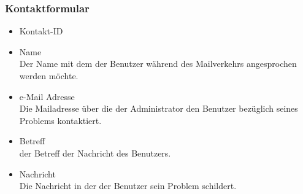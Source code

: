 \subsubsection*{Kontaktformular}
	\begin{itemize}
	    \item Kontakt-ID 
		\item Name \hfill \\
		Der Name mit dem der Benutzer während des Mailverkehrs angesprochen werden möchte.
		\item e-Mail Adresse \hfill \\
		Die Mailadresse über die der Administrator den Benutzer bezüglich seines Problems kontaktiert. 
		\item Betreff \hfill \\
		der Betreff der Nachricht des Benutzers.
		\item Nachricht \hfill \\
		Die Nachricht in der der Benutzer sein Problem schildert.
	\end{itemize}	
	
